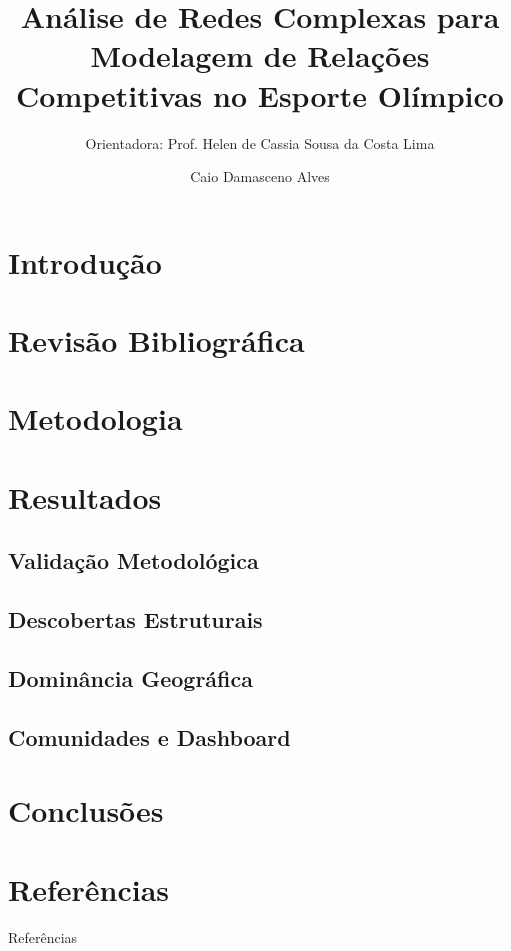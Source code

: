 \documentclass{beamer}
\title{Análise de Redes Complexas para Modelagem de Relações Competitivas no Esporte Olímpico}
\subtitle{Orientadora: Prof. Helen de Cassia Sousa da Costa Lima}
\author{Caio Damasceno Alves}
\begin{document}
\maketitle
\vspace{\baselineskip}

\section{Introdução}


\section{Revisão Bibliográfica}


\section{Metodologia}


\section{Resultados}

\subsection{Validação Metodológica}


\subsection{Descobertas Estruturais}


\subsection{Dominância Geográfica}


\subsection{Comunidades e Dashboard}


\section{Conclusões}


\section{Referências \faBookOpen{}}
\begin{frame}[allowframebreaks]{Referências}
    
    
\end{frame}

\backmatter
\end{document}
